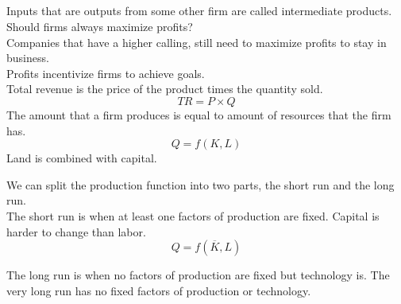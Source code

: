 \subsection{}
Inputs that are outputs from some other firm are called intermediate products.
Should firms always maximize profits?\\
Companies that have a higher calling, still need to maximize profits to stay in business.\\
Profits incentivize firms to achieve goals.\\
Total revenue is the price of the product times the quantity sold.
\begin{equation}
    TR = P \times Q
\end{equation}
The amount that a firm produces is equal to amount of resources that the firm has.\\
\begin{equation}
    Q = f(K,L)
\end{equation}
Land is combined with capital.
\par
We can split the production function into two parts, the short run and the long run.\\
The short run is when at least one factors of production are fixed.
Capital is harder to change than labor.
\begin{equation}
    Q = f(\overline{K}, L)
\end{equation}
\par
The long run is when no factors of production are fixed but technology is. The very long run has no fixed factors of production or technology.